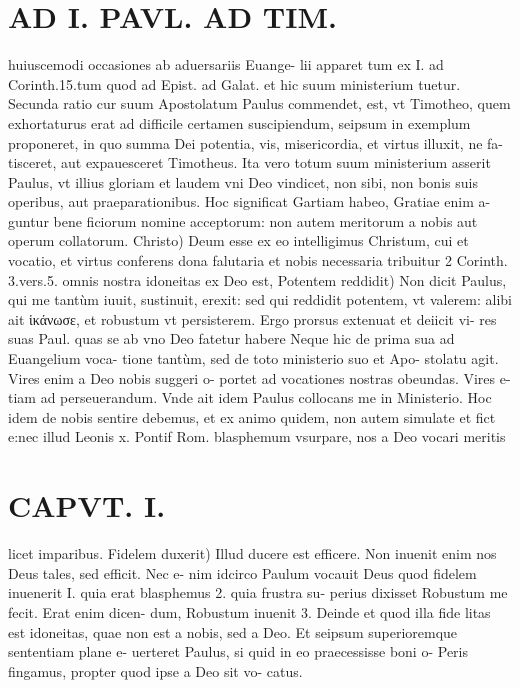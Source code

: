 \documentclass{article}
\begin{document}
\begin{pages}
\section*{AD I. PAVL. AD TIM. }
\marginpar{[ p.24 ]}\pstart huiuscemodi occasiones ab aduersariis Euange- lii apparet tum ex I. ad Corinth.15.tum quod ad Epist. ad Galat. et hic suum ministerium tuetur. Secunda ratio cur suum Apostolatum Paulus commendet, est, vt Timotheo, quem exhortaturus erat ad difficile certamen suscipiendum, seipsum in exemplum proponeret, in quo summa Dei potentia, vis, misericordia, et virtus illuxit, ne fa- tisceret, aut expauesceret Timotheus. Ita vero totum suum ministerium asserit Paulus, vt illius gloriam et laudem vni Deo vindicet, non sibi, non bonis suis operibus, aut praeparationibus. Hoc significat Gartiam habeo, Gratiae enim a- guntur bene ficiorum nomine acceptorum: non autem meritorum a nobis aut operum collatorum. Christo) Deum esse ex eo intelligimus Christum, cui et vocatio, et virtus conferens dona falutaria et nobis necessaria tribuitur 2 Corinth. 3.vers.5. omnis nostra idoneitas ex Deo est,  \pend\pstart Potentem reddidit) Non dicit Paulus, qui me tantùm iuuit, sustinuit, erexit: sed qui reddidit potentem, vt valerem: alibi ait ἱκάνωσε, et robustum vt persisterem. Ergo prorsus extenuat et deiicit vi- res suas Paul. quas se ab vno Deo fatetur habere Neque hic de prima sua ad Euangelium voca- tione tantùm, sed de toto ministerio suo et Apo- stolatu agit. Vires enim a Deo nobis suggeri o- portet ad vocationes nostras obeundas. Vires e- tiam ad perseuerandum. Vnde ait idem Paulus collocans me in Ministerio. Hoc idem de nobis sentire debemus, et ex animo quidem, non autem simulate et fict e:nec illud Leonis x. Pontif Rom. blasphemum vsurpare, nos a Deo vocari meritis  \pend
\section*{CAPVT. I. }
\marginpar{[ p.25 ]}\pstart licet imparibus.  \pend\pstart Fidelem duxerit) Illud ducere est efficere. Non inuenit enim nos Deus tales, sed efficit. Nec e- nim idcirco Paulum vocauit Deus quod fidelem inuenerit I. quia erat blasphemus 2. quia frustra su- perius dixisset Robustum me fecit. Erat enim dicen- dum, Robustum inuenit 3. Deinde et quod illa fide litas est idoneitas, quae non est a nobis, sed a Deo. Et seipsum superioremque sententiam plane e- uerteret Paulus, si quid in eo praecessisse boni o- Peris fingamus, propter quod ipse a Deo sit vo- catus.  \pend
{}
{}

\end{pages}
\end{document}
